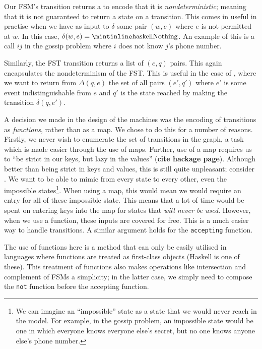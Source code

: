 \documentclass[10pt, a4paper]{report}
\begin{document}
Our FSM's transition returns a  to encode that it is
\emph{nondeterministic}; meaning that it is not guaranteed to return a state
on a transition. This comes in useful in practise when we have as input to
$\delta$ some pair $(w, e)$ where $e$ is not permitted at $w$. In this case,
$\delta(w, e) = \text{\mih{Nothing}}$. An example of this is a call $ij$ in the
gossip problem where $i$ does not know $j$'s phone number.

Similarly, the FST transition returns a list of $(e, q)$ pairs. This again
encapsulates the nondeterminism of the FST. This is useful in the case of
, where we want to return from
$\Delta(q, e)$ the set of all pairs $(e', q')$ where $e'$ is some event
indistinguishable from $e$ and $q'$ is the state reached by making the
transition $\delta(q, e')$.

A decision we made in the design of the machines was the encoding of transitions
as \emph{functions}, rather than as a map. We chose to do this for a number of
reasons. Firstly, we never wish to enumerate the set of transitions in the
graph, a task which is made easier through the use of maps. Further, use of a
map requires us to ``be strict in our keys, but lazy in the values''
(\textbf{cite hackage page}). Although better than being strict in keys and
values, this is still quite unpleasant; consider \mestar. We want to be able to
mimic from every state to every other, even the impossible states\footnote{We
  can imagine an ``impossible'' state as a state that we would never reach in
  the model. For example, in the gossip problem, an impossible state would be
  one in which everyone knows everyone else's secret, but no one knows anyone
  else's phone number.}. When using a map, this would mean we would require an
entry for all of these impossible state. This means that a lot of time would be
spent on entering keys into the map for states that \emph{will never be used}.
However, when we use a function, these inputs are covered for free. This is a
much easier way to handle transitions. A similar argument holds for the
\texttt{accepting} function. 

The use of functions here is a method that can only be easily utilised in
languages where functions are treated as first-class objects (Haskell is one of
these). This treatment of functions also makes operations like intersection and
complement of FSMs a simplicity; in the latter case, we simply need to compose
the \texttt{not} function before the accepting function. 
\end{document}
